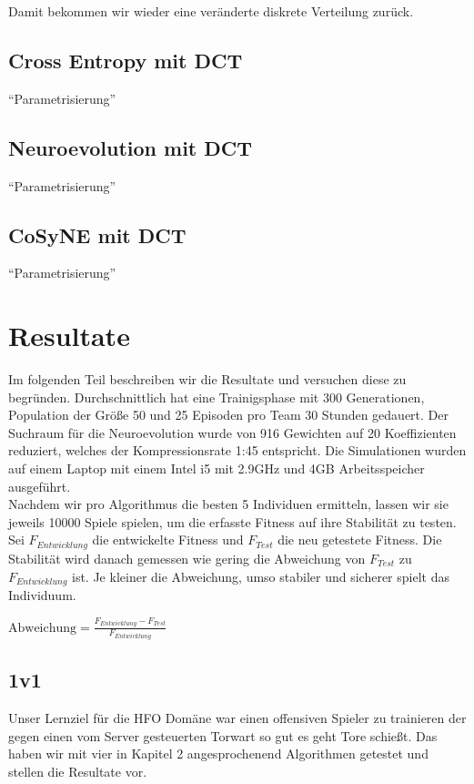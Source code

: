             Damit bekommen wir wieder eine veränderte diskrete Verteilung zurück.
        \subsection{Cross Entropy mit DCT}
            ``Parametrisierung''
        \subsection{Neuroevolution mit DCT}
            ``Parametrisierung''
        \subsection{CoSyNE mit DCT}
            ``Parametrisierung''

    \section{Resultate}
        Im folgenden Teil beschreiben wir die Resultate und versuchen diese zu begründen. Durchschnittlich hat eine Trainigsphase mit 300 Generationen, Population der Größe 50 und 25 Episoden pro Team 30 Stunden gedauert. Der Suchraum für die Neuroevolution wurde von 916 Gewichten auf 20 Koeffizienten reduziert, welches der Kompressionsrate 1:45 entspricht. Die Simulationen wurden auf einem Laptop mit einem Intel i5 mit 2.9GHz und 4GB Arbeitsspeicher ausgeführt.\\[2mm]
        \noindent
        Nachdem wir pro Algorithmus die besten 5 Individuen ermitteln, lassen wir sie jeweils 10000 Spiele spielen, um die erfasste Fitness auf ihre Stabilität zu testen. \\[2mm]
        \noindent
        Sei $F_{Entwicklung}$ die entwickelte Fitness und $F_{Test}$ die neu getestete Fitness. Die Stabilität wird danach gemessen wie gering die Abweichung von $F_{Test}$ zu $F_{Entwicklung}$ ist. Je kleiner die Abweichung, umso stabiler und sicherer spielt das Individuum.\\

        \begin{center}
            \begin{math}
                \text{Abweichung} = \frac{F_{Entwicklung} - F_{Test}}{F_{Entwicklung}}
            \end{math}
        \end{center}

        \subsection{1v1}
            Unser Lernziel für die HFO Domäne war einen offensiven Spieler zu trainieren der gegen einen vom Server gesteuerten Torwart so gut es geht Tore schießt. Das haben wir mit vier in Kapitel 2 angesprochenend Algorithmen getestet und stellen die Resultate vor. 

